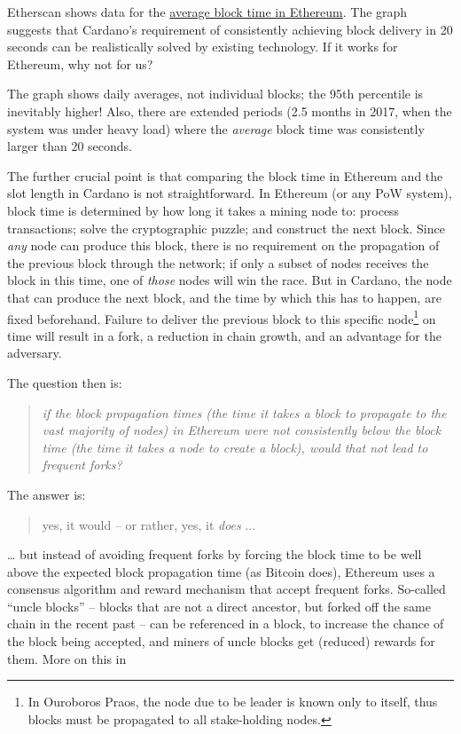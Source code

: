 \documentclass[11pt,a4paper]{article}
\begin{document}
Etherscan shows data for the
\href{https://etherscan.io/chart/blocktime}{{average block time in
Ethereum}}. The graph suggests that Cardano's requirement of
consistently achieving block delivery in 20 seconds can be realistically
solved by existing technology. If it works for Ethereum, why not for us?

The graph shows daily averages, not individual blocks; the 95th
percentile is inevitably higher! Also, there are extended periods (2.5
months in 2017, when the system was under heavy load) where the
\emph{average} block time was consistently larger than 20 seconds.

The further crucial point is that comparing the block time in Ethereum
and the slot length in Cardano is not straightforward. In Ethereum (or
any PoW system), block time is determined by how long it takes a mining
node to: process transactions; solve the cryptographic puzzle; and
construct the next block. Since \emph{any} node can produce this block,
there is no requirement on the propagation of the previous block through
the network; if only a subset of nodes receives the block in this time,
one of \emph{those} nodes will win the race. But in Cardano, the node
that can produce the next block, and the time by which this has to
happen, are fixed beforehand. Failure to deliver the previous block to
this specific node\footnote{In Ouroboros Praos, the node due to be
  leader is known only to itself, thus blocks must be propagated to all
  stake-holding nodes.} on time will result in a fork, a reduction in
chain growth, and an advantage for the adversary.

The question then is:

\begin{quote}
\emph{if the block propagation times (the time it takes a block to
propagate to the vast majority of nodes) in Ethereum were not
consistently below the block time (the time it takes a node to create a
block), would that not lead to frequent forks?}
\end{quote}

The answer is:

\begin{quote}
yes, it would -- or rather, yes, it \emph{does} ...
\end{quote}

\ldots{} but instead of avoiding frequent forks by forcing the block
time to be well above the expected block propagation time (as Bitcoin
does), Ethereum uses a consensus algorithm and reward mechanism that
accept frequent forks. So-called ``uncle blocks'' -- blocks that are not
a direct ancestor, but forked off the same chain in the recent past --
can be referenced in a block, to increase the chance of the block being
accepted, and miners of uncle blocks get (reduced) rewards for them.
More on this in
\end{document}
